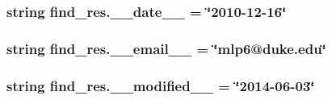\subsubsection[{\+\_\+\+\_\+date\+\_\+\+\_\+}]{\setlength{\rightskip}{0pt plus 5cm}string find\+\_\+res.\+\_\+\+\_\+date\+\_\+\+\_\+ = \char`\"{}2010-\/12-\/16\char`\"{}}\label{namespacefind__res_a2eb1844b89b617f8d362c2c45c8295ab}
\hypertarget{namespacefind__res_a61ba9c9ac672df8b70658896ffbc5166}{}
\subsubsection[{\+\_\+\+\_\+email\+\_\+\+\_\+}]{\setlength{\rightskip}{0pt plus 5cm}string find\+\_\+res.\+\_\+\+\_\+email\+\_\+\+\_\+ = \char`\"{}mlp6@duke.\+edu\char`\"{}}\label{namespacefind__res_a61ba9c9ac672df8b70658896ffbc5166}
\hypertarget{namespacefind__res_a4828c0504a776b6445463dde90113e4f}{}
\subsubsection[{\+\_\+\+\_\+modified\+\_\+\+\_\+}]{\setlength{\rightskip}{0pt plus 5cm}string find\+\_\+res.\+\_\+\+\_\+modified\+\_\+\+\_\+ = \char`\"{}2014-\/06-\/03\char`\"{}}\label{namespacefind__res_a4828c0504a776b6445463dde90113e4f}
